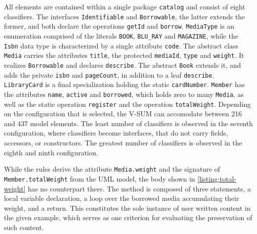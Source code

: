 All elements are contained within a single package \texttt{catalog} and consist of eight classifiers.
The interfaces \texttt{Identifiable} and \texttt{Borrowable}, the latter extends the former, and both declare the operations \texttt{getId} and \texttt{borrow}.
\texttt{MediaType} is an enumeration comprised of the literals \texttt{BOOK}, \texttt{BLU\_RAY} and \texttt{MAGAZINE}, while the \texttt{Isbn} data type is characterized by a single attribute \texttt{code}.
The abstract class \texttt{Media} carries the attributes \texttt{title}, the protected \texttt{mediaId}, \texttt{type} and \texttt{weight}.
It realizes \texttt{Borrowable} and declares \texttt{describe}.
The abstract \texttt{Book} extends it, and adds the private \texttt{isbn} and \texttt{pageCount}, in addition to a leaf \texttt{describe}.
\texttt{LibraryCard} is a final specialization holding the static \texttt{cardNumber}.
\texttt{Member} has the attributes \texttt{name}, \texttt{active} and \texttt{borrowed}, which holds zero to many \texttt{Media}, as well as the static operation \texttt{register} and the operation \texttt{totalWeight}.
Depending on the configuration that is selected, the V-SUM can accomodate between 216 and 437 model elements.
The least number of classifiers is observed in the seventh configuration, where classifiers become interfaces, that do not carry fields, accessors, or constructors.
The greatest number of classifiers is observed in the eighth and ninth configuration.



While the rules derive the attribute \texttt{Media.weight} and the signature of \texttt{Member.totalWeight} from the UML model, the body shown in \autoref{listing:total-weight} has no counterpart there.
The method is composed of three statements, a local variable declaration, a loop over the borrowed media accumulating their weight, and a return.
This constitutes the sole instance of user written content in the given example, which serves as one criterion for evaluating the preservation of such content.